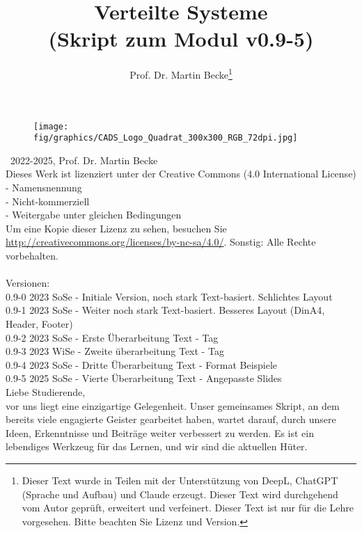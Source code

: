 \documentclass[a4paper,10pt]{book}
\title{Verteilte Systeme\\ (Skript zum Modul v0.9-5)}
\author{Prof. Dr. Martin Becke\footnote{Dieser Text wurde in Teilen mit der Unterstützung von DeepL, ChatGPT (Sprache und Aufbau) und Claude erzeugt. Dieser Text{} wird durchgehend vom Autor geprüft, erweitert und verfeinert. Dieser Text ist nur für die Lehre vorgesehen. Bitte beachten Sie Lizenz und Version.}}
\begin{document}
\maketitle
\vspace*{\fill} %
\begin{figure}[h]
  \centering
  \texttt{[image: fig/graphics/CADS\_Logo\_Quadrat\_300x300\_RGB\_72dpi.jpg]} %
\end{figure}
\vspace*{\fill}

\newpage

\noindent
\textcopyright\ 2022-2025, Prof. Dr. Martin Becke\\
Dieses Werk ist lizenziert unter der Creative Commons (4.0 International License)\\
- Namensnennung\\ - Nicht-kommerziell\\ - Weitergabe unter gleichen Bedingungen \\Um eine Kopie dieser Lizenz zu sehen, besuchen Sie\\ \url{http://creativecommons.org/licenses/by-nc-sa/4.0/}. 
Sonstig: Alle Rechte vorbehalten.
\noindent
\\\\
Versionen:\\
0.9-0 2023 SoSe - Initiale Version, noch stark Text-basiert. Schlichtes Layout\\
0.9-1 2023 SoSe - Weiter noch stark Text-basiert. Besseres Layout (DinA4, Header, Footer)\\
0.9-2 2023 SoSe - Erste Überarbeitung Text - Tag\\
0.9-3 2023 WiSe - Zweite überarbeitung Text - Tag \\
0.9-4 2023 SoSe - Dritte Überarbeitung Text - Format Beispiele\\
0.9-5 2025 SoSe - Vierte Überarbeitung Text - Angepasste Slides\\

Liebe Studierende,\\ vor uns liegt eine einzigartige Gelegenheit. Unser gemeinsames Skript, an dem bereits viele engagierte Geister gearbeitet haben, wartet darauf, durch unsere Ideen, Erkenntnisse und Beiträge weiter verbessert zu werden. Es ist ein lebendiges Werkzeug für das Lernen, und wir sind die aktuellen Hüter.
\end{document}
